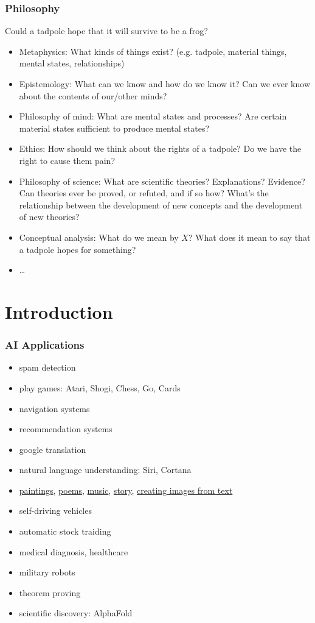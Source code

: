 \documentclass[UTF8,11pt,colorlinks,compress,openany]{beamer}%
\begin{document}
\begin{frame}\frametitle{Philosophy}
\begin{center}
Could a tadpole hope that it will survive to be a frog?
\end{center}
\begin{itemize}
	\item Metaphysics: What kinds of things exist? (e.g. tadpole, material things, mental states, relationships)
	\item Epistemology: What can we know and how do we know it? Can we ever know about the contents of our/other minds?
	\item Philosophy of mind: What are mental states and processes? Are certain material states sufficient to produce mental states?
	\item Ethics: How should we think about the rights of a tadpole? Do we have the right to cause them pain?
	\item Philosophy of science: What are scientific theories? Explanations? Evidence? Can theories ever be proved, or refuted, and if so how? What's the relationship between the development of new concepts and the development of new theories?
	\item Conceptual analysis: What do we mean by $X$? What does it mean to say that a tadpole hopes for something?
	\item \dots
\end{itemize}
\end{frame}

\section{Introduction}

\begin{frame}\frametitle{AI Applications}
\begin{itemize}
	\item spam detection
	\item play games: Atari, Shogi, Chess, Go, Cards
	\item navigation systems
	\item recommendation systems
	\item google translation
	\item natural language understanding: Siri, Cortana
	\item \href{https://deepart.io/}{paintings}, \href{https://www.aichpoem.com/}{poems}, \href{https://openai.com/blog/musenet/}{music}, \href{https://play.aidungeon.io/}{story}, \href{https://openai.com/blog/dall-e/}{creating images from text}
	\item self-driving vehicles
	\item automatic stock traiding
	\item medical diagnosis, healthcare
	\item military robots
	\item theorem proving
	\item scientific discovery: AlphaFold
\end{itemize}
\end{frame}
\end{document}
